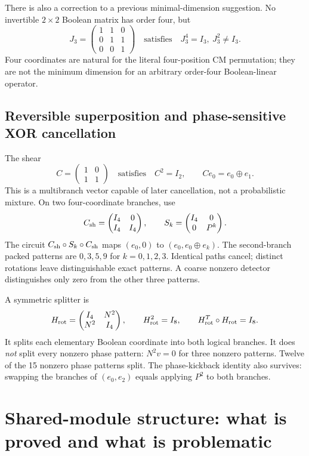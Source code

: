 \documentclass[11pt,a4paper]{article}
\theoremstyle{definition}\newtheorem{definition}[theorem]{Definition}
\begin{document}
There is also a correction to a previous minimal-dimension suggestion. No invertible $2\times2$ Boolean matrix has order four, but
\[
 J_3=\begin{pmatrix}1&1&0\\0&1&1\\0&0&1\end{pmatrix}
 \quad\text{satisfies}\quad J_3^4=I_3,\ J_3^2\ne I_3.
\]
Four coordinates are natural for the literal four-position CM permutation; they are not the minimum dimension for an arbitrary order-four Boolean-linear operator.

\subsection{Reversible superposition and phase-sensitive XOR cancellation}
The shear
\[
 C=\begin{pmatrix}1&0\\1&1\end{pmatrix}
 \quad\text{satisfies}\quad C^2=I_2,\qquad C e_0=e_0\oplus e_1.
\]
This is a multibranch vector capable of later cancellation, not a probabilistic mixture. On two four-coordinate branches, use
\[
 C_{\rm sh}=\begin{pmatrix}I_4&0\\I_4&I_4\end{pmatrix},
 \qquad S_k=\begin{pmatrix}I_4&0\\0&P^k\end{pmatrix}.
\]
The circuit $C_{\rm sh}\circ S_k\circ C_{\rm sh}$ maps $(e_0,0)$ to $(e_0,e_0\oplus e_k)$. The second-branch packed patterns are $0,3,5,9$ for $k=0,1,2,3$. Identical paths cancel; distinct rotations leave distinguishable exact patterns. A coarse nonzero detector distinguishes only zero from the other three patterns.

A symmetric splitter is
\[
 H_{\rm rot}=\begin{pmatrix}I_4&N^2\\N^2&I_4\end{pmatrix},
 \qquad H_{\rm rot}^2=I_8,\qquad H_{\rm rot}^T\circ H_{\rm rot}=I_8.
\]
It splits each elementary Boolean coordinate into both logical branches. It does \emph{not} split every nonzero phase pattern: $N^2v=0$ for three nonzero patterns. Twelve of the 15 nonzero phase patterns split. The phase-kickback identity also survives: swapping the branches of $(e_0,e_2)$ equals applying $P^2$ to both branches.

\section{Shared-module structure: what is proved and what is problematic}
\end{document}
